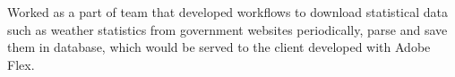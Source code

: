 \documentclass[a4paper]{srika-resume} %
\begin{document}
\begin{minipage}[t]{0.64\textwidth}
\sectionspace %



Worked as a part of team that developed workflows to download statistical data such as weather statistics from government websites periodically, parse and save them in database, which would be served to the client developed with Adobe Flex. 

\sectionspace %


\end{minipage} %








\end{document}
